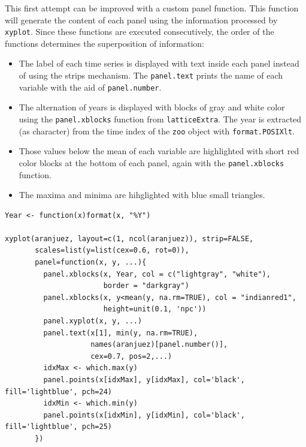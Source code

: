This first attempt can be improved with a custom panel
function. This function will generate the content of each panel
using the information processed by \texttt{xyplot}. Since these functions
are executed consecutively, the order of the functions determines
the superposition of information:
\begin{itemize}
\item The label of each time series is displayed with text inside each
  panel instead of using the strips mechanism. The \texttt{panel.text}
  prints the name of each variable with the aid of \texttt{panel.number}.
\item The alternation of years is displayed with blocks of gray and
  white color using the \texttt{panel.xblocks} function from
  \texttt{latticeExtra}. The year is extracted (as character) from the
  time index of the \texttt{zoo} object with \texttt{format.POSIXlt}.
\item Those values below the mean of each variable are highlighted
  with short red color blocks at the bottom of each panel, again
  with the \texttt{panel.xblocks} function.
\item The maxima and minima are hihglighted with blue small triangles.
\end{itemize}


\lstset{language=R}
\begin{lstlisting}
Year <- function(x)format(x, "%Y")

xyplot(aranjuez, layout=c(1, ncol(aranjuez)), strip=FALSE,
       scales=list(y=list(cex=0.6, rot=0)),
       panel=function(x, y, ...){
         panel.xblocks(x, Year, col = c("lightgray", "white"),
                       border = "darkgray")
         panel.xblocks(x, y<mean(y, na.rm=TRUE), col = "indianred1",
                       height=unit(0.1, 'npc'))
         panel.xyplot(x, y, ...)
         panel.text(x[1], min(y, na.rm=TRUE),
                    names(aranjuez)[panel.number()],
                    cex=0.7, pos=2,...)
         idxMax <- which.max(y)
         panel.points(x[idxMax], y[idxMax], col='black', fill='lightblue', pch=24)
         idxMin <- which.min(y)
         panel.points(x[idxMin], y[idxMin], col='black', fill='lightblue', pch=25)
       })
\end{lstlisting}

